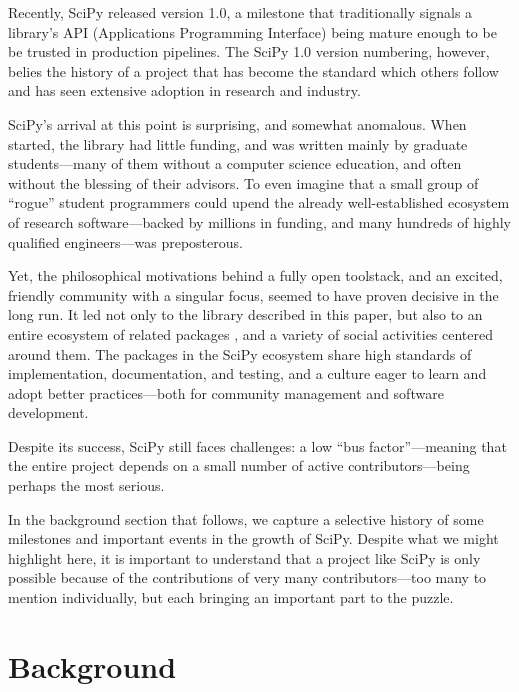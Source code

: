 \documentclass[fleqn,10pt]{wlscirep}
\begin{document}
Recently, SciPy released version 1.0, a milestone that traditionally
signals a library's API (Applications Programming Interface) being
mature enough to be be trusted in production pipelines.  The SciPy 1.0
version numbering, however, belies the history of a project that has
become the standard which others follow and has seen extensive
adoption in research and industry.

SciPy's arrival at this point is surprising, and somewhat anomalous.
When started, the library had little funding, and was written mainly
by graduate students---many of them without a computer science education, and often without the
blessing of their advisors.  To even imagine that a small group of
``rogue'' student programmers could upend the already well-established
ecosystem of research software---backed by millions in funding, and
many hundreds of highly qualified engineers\cite{mathworks-globe-97,
esri-revenue,bloom-wolfram}---was preposterous.

Yet, the philosophical motivations behind a fully open toolstack, and
an excited, friendly community with a singular focus, seemed to have
proven decisive in the long run.  It led not only to the library
described in this paper, but also to an entire ecosystem of related
packages \cite{scipy-ecosystem}, and a variety of social activities centered around
them\cite{social-python}. The packages in the SciPy ecosystem 
share high standards of implementation,
documentation, and testing, and a culture eager to learn and adopt
better practices---both for community management and software
development.

Despite its success, SciPy still faces challenges:
a low ``bus factor''---meaning that the entire project depends on a small number of
active contributors---being perhaps the most serious.

In the background section that follows, we capture a selective history
of some milestones and important events in the growth of SciPy.
Despite what we might highlight here, it is important to understand
that a project like SciPy is only possible because of the
contributions of very many contributors---too many to mention
individually, but each bringing an important part to the puzzle.

\section*{Background}
\end{document}
